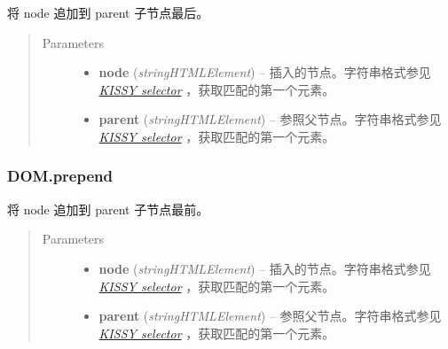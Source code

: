\documentclass[letterpaper,10pt,english]{sphinxmanual}
\begin{document}
\begin{fulllineitems}
\label{api/core/dom/append:DOM.append}
将 node 追加到 parent 子节点最后。
\begin{quote}\begin{description}
\item[{Parameters}] \leavevmode\begin{itemize}
\item {}
\textbf{node} (\emph{string\textbar{}HTMLElement}) -- 插入的节点。字符串格式参见 {\hyperref[api/core/dom/selector:dom-selector]{\emph{KISSY selector}}} ，获取匹配的第一个元素。

\item {}
\textbf{parent} (\emph{string\textbar{}HTMLElement}) -- 参照父节点。字符串格式参见 {\hyperref[api/core/dom/selector:dom-selector]{\emph{KISSY selector}}} ，获取匹配的第一个元素。

\end{itemize}

\end{description}\end{quote}

\end{fulllineitems}



\subsubsection{DOM.prepend}
\label{api/core/dom/prepend:dom-prepend}\label{api/core/dom/prepend::doc}

\begin{fulllineitems}
\label{api/core/dom/prepend:DOM.prepend}
将 node 追加到 parent 子节点最前。
\begin{quote}\begin{description}
\item[{Parameters}] \leavevmode\begin{itemize}
\item {}
\textbf{node} (\emph{string\textbar{}HTMLElement}) -- 插入的节点。字符串格式参见 {\hyperref[api/core/dom/selector:dom-selector]{\emph{KISSY selector}}} ，获取匹配的第一个元素。

\item {}
\textbf{parent} (\emph{string\textbar{}HTMLElement}) -- 参照父节点。字符串格式参见 {\hyperref[api/core/dom/selector:dom-selector]{\emph{KISSY selector}}} ，获取匹配的第一个元素。

\end{itemize}

\end{description}\end{quote}

\end{fulllineitems}
\end{document}
